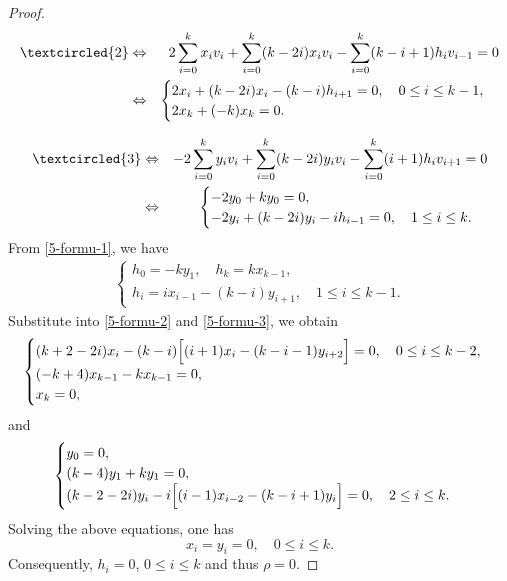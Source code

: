 \documentclass[reqno]{amsart}
\theoremstyle{definition}
\begin{document}
\begin{proof}
\begin{eqnarray}\label{5-formu-2}
\textcircled{2}&\Leftrightarrow & 2\sum_{i=0}^{k}x_{i}v_{i}+\sum_{i=0}^{k}(k-2i)x_{i}v_{i}-\sum_{i=0}^{k}(k-i+1)h_{i}v_{i-1}=0\nonumber\\
               &\Leftrightarrow & \begin{cases}
                                     2x_{i}+(k-2i)x_{i}-(k-i)h_{i+1}=0, \quad 0\leq i\leq k-1,\\
                                     2x_{k}+(-k)x_{k}=0.
                                   \end{cases}
\end{eqnarray}

\begin{eqnarray}\label{5-formu-3}
\textcircled{3}&\Leftrightarrow & -2\sum_{i=0}^{k}y_{i}v_{i}+\sum_{i=0}^{k}(k-2i)y_{i}v_{i}-\sum_{i=0}^{k}(i+1)h_{i}v_{i+1}=0\nonumber\\
               &\Leftrightarrow & \begin{cases}
                                     -2y_{0}+ky_{0}=0,\\
                                     -2y_{i}+(k-2i)y_{i}-ih_{i-1}=0, \quad 1\leq i\leq k.
                                     \end{cases}
\end{eqnarray}
From \eqref{5-formu-1}, we have
\begin{eqnarray*}
\begin{cases}
h_{0}=-ky_{1},\quad h_{k}=kx_{k-1},\\
h_{i}=ix_{i-1}-(k-i)y_{i+1}, \quad 1\leq i\leq k-1.
 \end{cases}
\end{eqnarray*}
Substitute into \eqref{5-formu-2} and \eqref{5-formu-3}, we obtain
\begin{eqnarray*}
 \begin{cases}
 (k+2-2i)x_{i}-(k-i)\Big{[}(i+1)x_{i}-(k-i-1)y_{i+2}\Big{]}=0, \quad 0\leq i\leq k-2,\\
 (-k+4)x_{k-1}-kx_{k-1}=0,\\
 x_{k}=0,
 \end{cases}
\end{eqnarray*}
and
\begin{eqnarray*}
\begin{cases}
y_{0}=0,\\
(k-4)y_{1}+ky_{1}=0,\\
(k-2-2i)y_{i}-i\Big{[}(i-1)x_{i-2}-(k-i+1)y_{i}\Big{]}=0, \quad 2\leq i\leq k.
\end{cases}
\end{eqnarray*}
Solving the above equations, one has
$$x_{i}=y_{i}=0, \quad  0\leq i\leq k.$$
Consequently, $h_{i}=0$, $ 0\leq i\leq k$ and thus $\rho=0$.
\end{proof}
\end{document}
